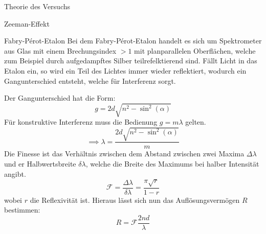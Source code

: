 \documentclass[pdftex, a4paper,11pt, twoside, ngerman]{report}
\begin{document}
\begin{chapter}{Theorie des Versuchs}
\begin{section}{Zeeman-Effekt}
      
      
      \begin{subsection}{Fabry-Pérot-Etalon}
        Bei dem Fabry-Pérot-Etalon handelt es sich um Spektrometer aus Glas mit
        einem Brechungsindex $>1$ mit planparallelen Oberflächen, welche zum
        Beispiel durch aufgedampftes Silber teilrefelktierend sind. Fällt Licht
        in das Etalon ein, so wird ein Teil des Lichtes immer wieder
        reflektiert, wodurch ein Gangunterschied entsteht, welche für
        Interferenz sorgt. 
        
        Der Gangunterschied hat die Form:
        \begin{equation}
          \label{eq:Gangunterschied}
          g = 2d\sqrt{n^2-\sin^2(\alpha)}
        \end{equation}
        Für konstruktive Interferenz muss die Bedienung $g = m\lambda$ gelten.
        \begin{equation}
          \label{eq:GangunterschiedLambda}
          \implies \lambda = \frac{2d\sqrt{n^2-\sin^2(\alpha)}}m
        \end{equation}
        Die Finesse ist das Verhältnis zwischen dem Abstand zwischen zwei
        Maxima $\Delta\lambda$ und er Halbwertsbreite $\delta\lambda$, welche
        die Breite des Maximums bei halber Intensität angibt.
        \begin{equation}
          \label{eq:Finesse}
          \mathcal{F}=\frac{\Delta\lambda}{\delta\lambda} =
          \frac{\pi\sqrt r}{1-r}
        \end{equation}
        wobei $r$ die Reflexivität ist.
        Hieraus lässt sich nun das Auflösungsvermögen $R$ bestimmen:
        \begin{equation}
          \label{eq:Aufloesung}
          R = \mathcal{F}\frac{2nd}{\lambda}
        \end{equation}
        \begin{figure}[b!]
          \centering
          \begin{minipage}{0.48\textwidth}
            \centering

\end{minipage}
\end{figure}
\end{subsection}
\end{section}
\end{chapter}
\end{document}
